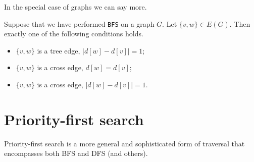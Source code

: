 In the special case of graphs we can say more.

\begin{Theorem} \label{thm:BFS-grapharcclass}
Suppose that we have performed \texttt{BFS} on a graph $G$. 
Let $\{v, w\}\in E(G)$. Then exactly one of the following conditions holds.
\begin{itemize}
	\item $\{v, w\}$ is a tree edge, $| d[w] - d[v] |= 1$;
	\item $\{v, w\}$ is a cross edge, $d[w] = d[v]$;
	\item $\{v, w\}$ is a cross edge, $| d[w] - d[v] | = 1$.
\end{itemize}
\end{Theorem}


\section{Priority-first search} \label{sec:PFS}
Priority-first search is a more general and sophisticated form of traversal that encompasses both BFS and DFS (and others). 

